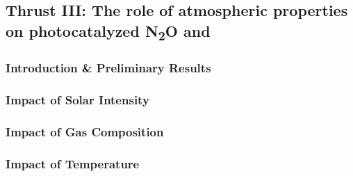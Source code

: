 \newpage
\subsection{Thrust III: The role of atmospheric properties on photocatalyzed N\textsubscript{2}O and \NH }
\label{sec:SA3}
\vspace{2mm}

\subsubsection*{Introduction \& Preliminary Results}

\subsubsection{Impact of Solar Intensity}
\vspace{2mm}

\subsubsection{Impact of Gas Composition}
\vspace{2mm}


\subsubsection{Impact of Temperature}
\vspace{2mm}

